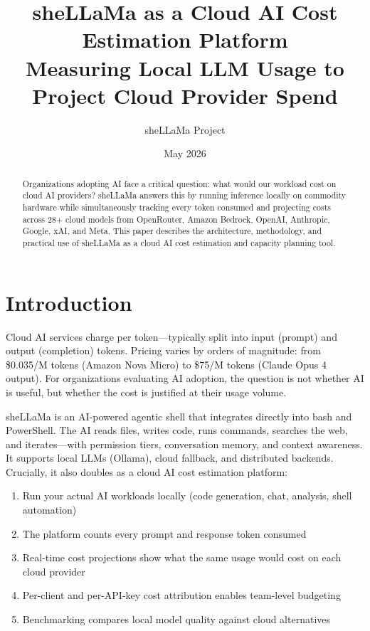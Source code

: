 \documentclass[11pt,a4paper]{article}
\title{\textbf{sheLLaMa as a Cloud AI Cost Estimation Platform}\\[4pt]\large Measuring Local LLM Usage to Project Cloud Provider Spend}
\author{sheLLaMa Project}
\date{May 2026}
\begin{document}
\maketitle
\thispagestyle{fancy}

\begin{abstract}
Organizations adopting AI face a critical question: what would our workload cost on cloud AI providers? sheLLaMa answers this by running inference locally on commodity hardware while simultaneously tracking every token consumed and projecting costs across 28+ cloud models from OpenRouter, Amazon Bedrock, OpenAI, Anthropic, Google, xAI, and Meta. This paper describes the architecture, methodology, and practical use of sheLLaMa as a cloud AI cost estimation and capacity planning tool.
\end{abstract}

\tableofcontents
\newpage

\section{Introduction}

Cloud AI services charge per token---typically split into input (prompt) and output (completion) tokens. Pricing varies by orders of magnitude: from \$0.035/M tokens (Amazon Nova Micro) to \$75/M tokens (Claude Opus 4 output). For organizations evaluating AI adoption, the question is not whether AI is useful, but whether the cost is justified at their usage volume.

sheLLaMa is an AI-powered agentic shell that integrates directly into bash and PowerShell. The AI reads files, writes code, runs commands, searches the web, and iterates---with permission tiers, conversation memory, and context awareness. It supports local LLMs (Ollama), cloud fallback, and distributed backends. Crucially, it also doubles as a cloud AI cost estimation platform:

\begin{enumerate}
  \item Run your actual AI workloads locally (code generation, chat, analysis, shell automation)
  \item The platform counts every prompt and response token consumed
  \item Real-time cost projections show what the same usage would cost on each cloud provider
  \item Per-client and per-API-key cost attribution enables team-level budgeting
  \item Benchmarking compares local model quality against cloud alternatives
\end{enumerate}
\end{document}
